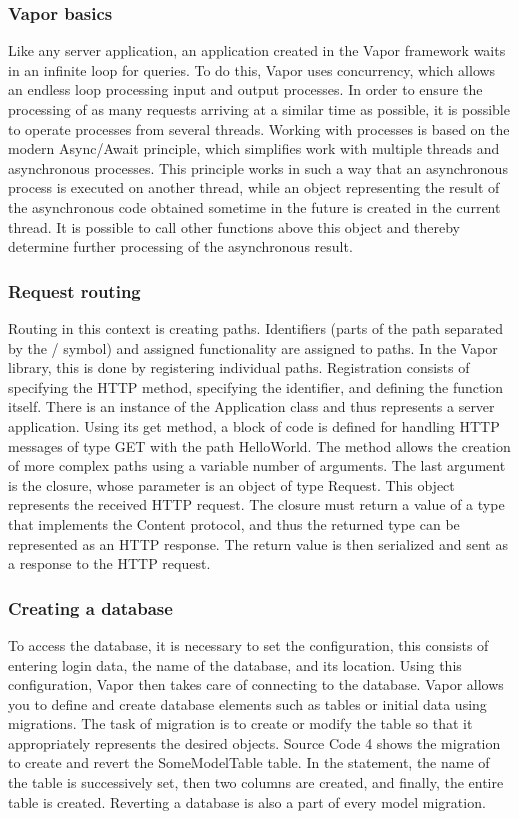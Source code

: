 \documentclass[
  biblatex = false,
  language=english,
  figures=false,
  sourcecodes,
  glossaries,
  index
]{kidiplom}
\begin{document}
\subsubsection{Vapor basics}
Like any server application, an application created in the Vapor framework \cite{bib5} waits in an infinite loop for queries. To do this, Vapor uses concurrency, which allows an endless loop processing input and output processes. In order to ensure the processing of as many requests arriving at a similar time as possible, it is possible to operate processes from several threads. Working with processes is based on the modern Async/Await principle, which simplifies work with multiple threads and asynchronous processes.
This principle works in such a way that an asynchronous process is executed on another thread, while an object representing the result of the asynchronous code obtained sometime in the future is created in the current thread. It is possible to call other functions above this object and thereby determine further processing of the asynchronous result.

\subsubsection{Request routing}
Routing in this context is creating paths. Identifiers (parts of the path separated by the / symbol) and assigned functionality are assigned to paths. In the Vapor library, this is done by registering individual paths. Registration consists of specifying the HTTP method, specifying the identifier, and defining the function itself.
There is an instance of the Application class and thus represents a server application. Using its get method, a block of code is defined for handling HTTP messages of type GET with the path HelloWorld. The method allows the creation of more complex paths using a variable number of arguments. The last argument is the closure, whose parameter is an object of type Request. This object represents the received HTTP request. The closure must return a value of a type that implements the Content protocol, and thus the returned type can be represented as an HTTP response. The return value is then serialized and sent as a response to the HTTP request.

\subsubsection{Creating a database}
To access the database, it is necessary to set the configuration, this consists of entering login data, the name of the database, and its location. Using this configuration, Vapor then takes care of connecting to the database. Vapor allows you to define and create database elements such as tables or initial data using migrations. The task of migration is to create or modify the table so that it appropriately represents the desired objects. Source Code 4 shows the migration to create and revert the SomeModelTable table. In the statement, the name of the table is successively set, then two columns are created, and finally, the entire table is created. Reverting a database is also a part of every model migration.
\end{document}

